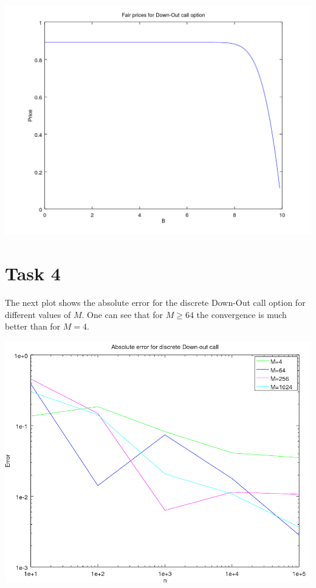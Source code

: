 \documentclass[10pt,a4paper]{article}
\begin{document}
\begin{center}
	\includegraphics[scale=0.4]{images/fair_prices_down_out_call.png}
\end{center}

\section*{Task 4}
The next plot shows the absolute error for the discrete Down-Out call option for different values of $M$. One can see that for $M\geq64$ the convergence is much better than for $M=4$.  

\begin{center}
	\includegraphics[scale=0.55]{images/convergence_plot_discrete_down_out_call.png}
\end{center}
\end{document}

